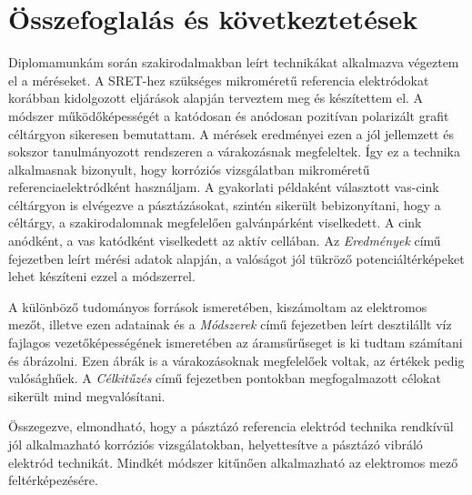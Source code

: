 \chapter{Összefoglalás és következtetések}
\pagestyle{headings}

Diplomamunkám során szakirodalmakban leírt technikákat alkalmazva végeztem el a méréseket. A SRET-hez szükséges mikroméretű referencia elektródokat korábban kidolgozott eljárások alapján terveztem meg és készítettem el. A módszer működőképességét a katódosan és anódosan pozitívan polarizált grafit céltárgyon sikeresen bemutattam. A mérések eredményei ezen a jól jellemzett és sokszor tanulmányozott rendszeren a várakozásnak megfeleltek. Így ez a technika alkalmasnak bizonyult, hogy korróziós vizsgálatban mikroméretű referenciaelektródként használjam. A gyakorlati példaként választott vas-cink céltárgyon is elvégezve a pásztázásokat, szintén sikerült bebizonyítani, hogy a céltárgy, a szakirodalomnak megfelelően galvánpárként viselkedett. A cink anódként, a vas katódként viselkedett az aktív cellában. Az \emph{Eredmények} című fejezetben leírt mérési adatok alapján, a valóságot jól tükröző potenciáltérképeket lehet készíteni ezzel a módszerrel. 

A különböző tudományos források ismeretében, kiszámoltam az elektromos mezőt, illetve ezen adatainak és a \emph{Módszerek} című fejezetben leírt desztilállt víz fajlagos vezetőképességének ismeretében az áramsűrűseget is ki tudtam számítani és ábrázolni. Ezen ábrák is a várakozásoknak megfelelőek voltak, az értékek pedig valósághűek.
A \emph{Célkitűzés} című fejezetben pontokban megfogalmazott célokat sikerült mind megvalósítani.

Összegezve, elmondható, hogy a pásztázó referencia elektród technika rendkívül jól alkalmazható korróziós vizsgálatokban, helyettesítve a pásztázó vibráló elektród technikát. Mindkét módszer kitűnően alkalmazható az elektromos mező feltérképezésére.
